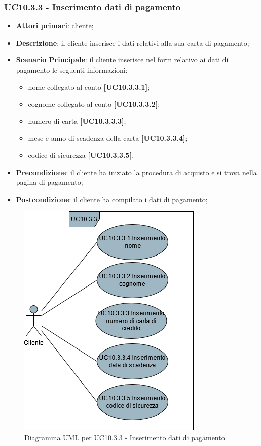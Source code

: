 \subsubsection{UC10.3.3 - Inserimento dati di pagamento}
\begin{itemize}
\item \textbf{Attori primari}: cliente;
\item \textbf{Descrizione}: il cliente inserisce i dati relativi alla sua carta di pagamento;
\item \textbf{Scenario Principale}: il cliente inserisce nel form relativo ai dati di pagamento le seguenti informazioni:
\begin{itemize}
	\item nome collegato al conto \textbf{[UC10.3.3.1]};
	\item cognome collegato al conto \textbf{[UC10.3.3.2]};
	\item numero di carta \textbf{[UC10.3.3.3]};
	\item mese e anno di scadenza della carta \textbf{[UC10.3.3.4]};
	\item codice di sicurezza \textbf{[UC10.3.3.5]}.
\end{itemize}
\item \textbf{Precondizione}: il cliente ha iniziato la procedura di acquisto e si trova nella pagina di pagamento;
\item \textbf{Postcondizione}: il cliente ha compilato i dati di pagamento;
\end{itemize}

\begin{figure}[H]
\centering
\includegraphics[scale=0.6]{res/UseCase/Immagini/InserimentoDatiPagamento}
\caption{Diagramma UML per UC10.3.3 - Inserimento dati di pagamento}
\end{figure}

